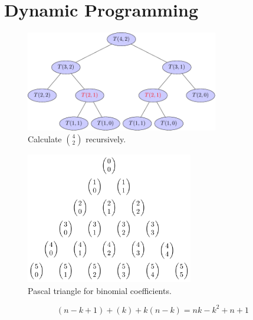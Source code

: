 
\chapter{Dynamic Programming}	\label{chapter:dp}



\begin{figure}[h]
  \includegraphics[width = 0.75\textwidth]{figs/binom-4-2}
  \caption{Calculate $\binom{4}{2}$ recursively.}
  \label{fig:binom-recursive}
\end{figure}

\begin{figure}[h]
  \includegraphics[width = 0.65\textwidth]{figs/pascal}
  \caption{Pascal triangle for binomial coefficients.}
  \label{fig:pascal}
\end{figure}



\[
  (n-k+1) + (k) + k (n-k) = nk - k^2 + n + 1
\]



